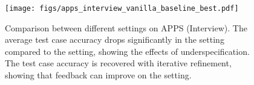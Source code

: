 \begin{figure}[t]
    \texttt{[image: figs/apps\_interview\_vanilla\_baseline\_best.pdf]}
    \caption{
        Comparison between different settings on APPS (Interview).  The average test case accuracy drops significantly in the \baseline{} setting compared to the \vanilla{} setting, showing the effects of underspecification.
        The test case accuracy is recovered with iterative refinement, showing that \user{} feedback can improve on the \vanilla{} setting.
    }
    \vspace{-5pt}
    
    \label{fig:vanilla_baseline}
\end{figure}
